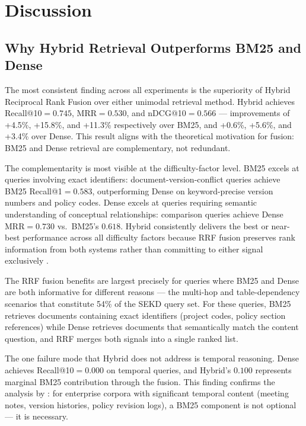 \chapter{Discussion}
\label{chap:discussion}

\section{Why Hybrid Retrieval Outperforms BM25 and Dense}
\label{sec:disc_hybrid}

The most consistent finding across all experiments is the superiority of Hybrid Reciprocal Rank Fusion over either unimodal retrieval method. Hybrid achieves Recall@10$={0.745}$, MRR$={0.530}$, and nDCG@10$={0.566}$ --- improvements of +4.5\%, +15.8\%, and +11.3\% respectively over BM25, and +0.6\%, +5.6\%, and +3.4\% over Dense. This result aligns with the theoretical motivation for fusion: BM25 and Dense retrieval are complementary, not redundant.

The complementarity is most visible at the difficulty-factor level. BM25 excels at queries involving exact identifiers: document-version-conflict queries achieve BM25 Recall@1$={0.583}$, outperforming Dense on keyword-precise version numbers and policy codes. Dense excels at queries requiring semantic understanding of conceptual relationships: comparison queries achieve Dense MRR$={0.730}$ vs.\ BM25's $0.618$. Hybrid consistently delivers the best or near-best performance across all difficulty factors because RRF fusion preserves rank information from both systems rather than committing to either signal exclusively \citep{cormack2009rrf}.

The RRF fusion benefits are largest precisely for queries where BM25 and Dense are both informative for different reasons --- the multi-hop and table-dependency scenarios that constitute 54\% of the SEKD query set. For these queries, BM25 retrieves documents containing exact identifiers (project codes, policy section references) while Dense retrieves documents that semantically match the content question, and RRF merges both signals into a single ranked list.

The one failure mode that Hybrid does not address is temporal reasoning. Dense achieves Recall@10$={0.000}$ on temporal queries, and Hybrid's $0.100$ represents marginal BM25 contribution through the fusion. This finding confirms the analysis by \citet{manning2008ir}: for enterprise corpora with significant temporal content (meeting notes, version histories, policy revision logs), a BM25 component is not optional --- it is necessary.

